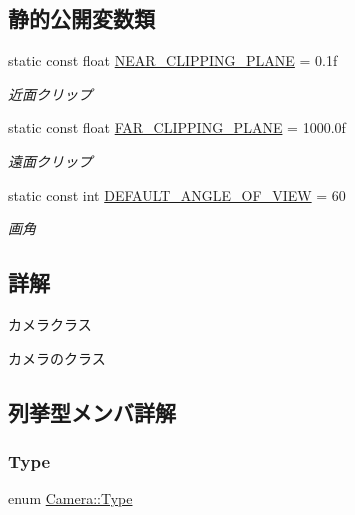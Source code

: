 \subsection*{静的公開変数類}
\begin{DoxyCompactItemize}
\item 
static const float \mbox{\hyperlink{class_camera_ad2e91249b7878a87cd23cf7dd5d86e00}{N\+E\+A\+R\+\_\+\+C\+L\+I\+P\+P\+I\+N\+G\+\_\+\+P\+L\+A\+NE}} = 0.\+1f
\begin{DoxyCompactList}\small\item\em 近面クリップ \end{DoxyCompactList}\item 
static const float \mbox{\hyperlink{class_camera_a90ee4c7f7bbcb5d2b0ab86d14ed60d90}{F\+A\+R\+\_\+\+C\+L\+I\+P\+P\+I\+N\+G\+\_\+\+P\+L\+A\+NE}} = 1000.\+0f
\begin{DoxyCompactList}\small\item\em 遠面クリップ \end{DoxyCompactList}\item 
static const int \mbox{\hyperlink{class_camera_a0e0f326c66006cf7f9dc29b3e2b86b81}{D\+E\+F\+A\+U\+L\+T\+\_\+\+A\+N\+G\+L\+E\+\_\+\+O\+F\+\_\+\+V\+I\+EW}} = 60
\begin{DoxyCompactList}\small\item\em 画角 \end{DoxyCompactList}\end{DoxyCompactItemize}


\subsection{詳解}
カメラクラス 

カメラのクラス 

\subsection{列挙型メンバ詳解}
\mbox{\label{class_camera_a3b0a1f58deca679ac665f61c480d1dcb}} 
\subsubsection{\texorpdfstring{Type}{Type}}
{\footnotesize\ttfamily enum \mbox{\hyperlink{class_camera_a3b0a1f58deca679ac665f61c480d1dcb}{Camera\+::\+Type}}}

